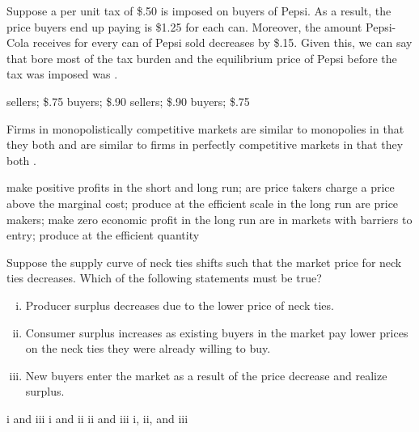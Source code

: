 \documentclass[addpoints,11pt]{exam}
\theoremstyle{definition}
\newcommand{\blank}[0]{\underline{\hspace{3cm}}}
\begin{document}
\begin{questions}
	
\question Suppose a per unit tax of \$.50 is imposed on buyers of Pepsi. As a result, the price buyers end up paying is \$1.25 for each can. Moreover, the amount Pepsi-Cola receives for every can of Pepsi sold decreases by \$.15. Given this, we can say that \underline{\hspace{3cm}} bore most of the tax burden and the equilibrium price of Pepsi before the tax was imposed was \underline{\hspace{3cm}}.


\begin{choices}
	\choice sellers; \$.75
	\CorrectChoice buyers; \$.90
	\choice sellers; \$.90
	\choice buyers; \$.75
\end{choices}


\question Firms in monopolistically competitive markets are similar to monopolies in that they both \underline{\hspace{3cm}} and are similar to firms in perfectly competitive markets in that they both \blank.

\begin{choices}
	\choice make positive profits in the short and long run; are price takers
	\choice charge a price above the marginal cost; produce at the efficient scale in the long run
	\CorrectChoice are price makers; make zero economic profit in the long run
	\choice are in markets with barriers to entry; produce at the efficient quantity
\end{choices}

\newpage

\question Suppose the supply curve of neck ties shifts such that the market price for neck ties decreases. Which of the following statements must be true?

	\begin{enumerate}[i.]
		\item Producer surplus decreases due to the lower price of neck ties.
		\item Consumer surplus increases as existing buyers in the market pay lower prices on the neck ties they were already willing to buy.
		\item New buyers enter the market as a result of the price decrease and realize surplus.
	\end{enumerate}

\begin{choices}
		\choice i and iii
		\choice i and ii
		\CorrectChoice ii and iii
		\choice i, ii, and iii
\end{choices}


\end{questions}
\end{document}
